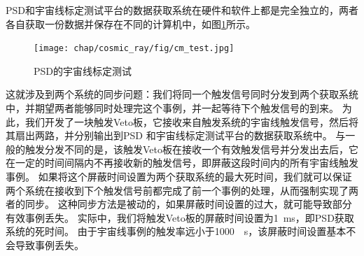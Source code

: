 PSD和宇宙线标定测试平台的数据获取系统在硬件和软件上都是完全独立的，两者各自获取一份数据并保存在不同的计算机中，如图\ref{fig:cosmic_ray:cm_test}所示。
\label{sec:cosmic_ray:cm_test}
\begin{figure}[htbp]
	\centering
	\texttt{[image: chap/cosmic\_ray/fig/cm\_test.jpg]}
	\caption{PSD的宇宙线标定测试}
	\label{fig:cosmic_ray:cm_test}
\end{figure}
这就涉及到两个系统的同步问题：我们将同一个触发信号同时分发到两个获取系统中，并期望两者能够同时处理完这个事例，并一起等待下个触发信号的到来。
为此，我们开发了一块触发Veto板，它接收来自触发系统的宇宙线触发信号，然后将其扇出两路，并分别输出到PSD
和宇宙线标定测试平台的数据获取系统中。
与一般的触发分发不同的是，该触发Veto板在接收一个有效触发信号并分发出去后，它在一定的时间间隔内不再接收新的触发信号，即屏蔽这段时间内的所有宇宙线触发事例。
如果将这个屏蔽时间设置为两个获取系统的最大死时间，我们就可以保证两个系统在接收到下个触发信号前都完成了前一个事例的处理，从而强制实现了两者的同步。
这种同步方法是被动的，如果屏蔽时间设置的过大，就可能导致部分有效事例丢失。
实际中，我们将触发Veto板的屏蔽时间设置为\SI{1}{ms}，即PSD获取系统的死时间。
由于宇宙线事例的触发率远小于\SI{1000}{\per\second}，该屏蔽时间设置基本不会导致事例丢失。

